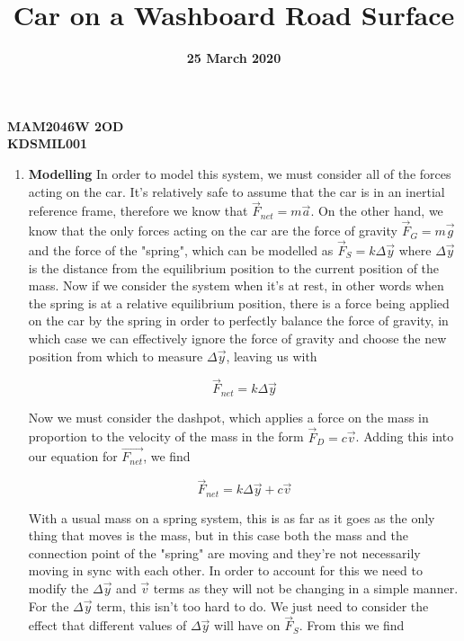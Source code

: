 \documentclass[12pt]{article}
\title{Car on a Washboard Road Surface}
\date{\textbf{25 March 2020}}
\author{}
\begin{document}
    \maketitle
    \center
    \textbf{\large{MAM2046W 2OD}}\\
    \textbf{\large{KDSMIL001}}\\

    \begin{enumerate}
        \item \textbf{Modelling} \newline
        In order to model this system, we must consider all of the forces acting on the car. 
        It's relatively safe to assume that the car is in an inertial reference frame, therefore 
        we know that $\vec{F}_{net}=m\vec{a}$. On the other hand, we know that the only forces 
        acting on the car are the force of gravity $\vec{F}_G = m\vec{g}$ and the force of the 
        "spring", which can be modelled as $\vec{F}_S = k\Delta \vec{y}$ where $\Delta \vec{y}$ 
        is the distance from the equilibrium position to the current position of the mass.
        Now if we consider the system when it's at rest, in other words when the spring is at a 
        relative equilibrium position, there is a force being applied on the car by the spring in 
        order to perfectly balance the force of gravity, in which case we can effectively ignore 
        the force of gravity and choose the new position from which to measure $\Delta \vec{y}$, 
        leaving us with

        \begin{equation}
            \vec{F}_{net} = k\Delta \vec{y}
        \end{equation}

        \noindent
        Now we must consider the dashpot, which applies a force on the mass in proportion to 
        the velocity of the mass in the form $\vec{F}_D = c\vec{v}$. Adding this into our 
        equation for $\vec{F_{net}}$, we find 

        \begin{equation}
            \vec{F}_{net} = k\Delta \vec{y} + c\vec{v}
        \end{equation}

        \noindent
        With a usual mass on a spring system, this is as far as it goes as the only thing that 
        moves is the mass, but in this case both the mass and the connection point of the 
        "spring" are moving and they're not necessarily moving in sync with each other. In 
        order to account for this we need to modify the $\Delta\vec{y}$ and $\vec{v}$ terms 
        as they will not be changing in a simple manner. For the $\Delta\vec{y}$ term, this 
        isn't too hard to do. We just need to consider the effect that different values of 
        $\Delta\vec{y}$ will have on $\vec{F}_S$. From this we find 


\end{enumerate}
\end{document}
